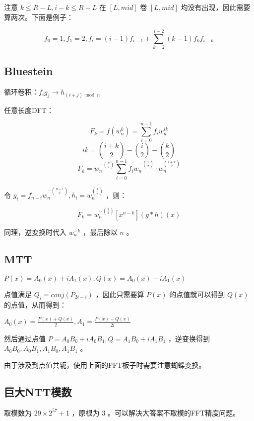 注意 $k\le R-L,i-k\le R-L$ 在 $[L,mid]$ 卷 $[L,mid]$ 均没有出现，因此需要算两次。下面是例子：

\vspace{-0.4cm}

$$
f_0=1,f_1=2,f_i=(i-1)f_{i-1}+\sum_{k=2}^{i-2}(k-1)f_kf_{i-k}
$$

\vspace{-0.1cm}



\subsection{Bluestein}

循环卷积：$f_ig_j\to h_{(i+j)\bmod n}$

任意长度DFT：

$$
F_k=f(w_n^k)=\sum_{i=0}^{n-1}f_iw_n^{ik}
$$
$$
ik={i+k\choose 2}-{i\choose 2}-{k\choose 2}
$$
$$
F_k=w_n^{-{k\choose 2}}\sum_{i=0}^{n-1}f_iw_n^{-{i\choose 2}}\cdot w_n^{i+k\choose 2}
$$

令 $g_{i}=f_{n-i}w_n^{-{n-i\choose 2}},h_i=w_n^{i\choose 2}$ ，则：

$$
F_{k}=w_n^{-{k\choose 2}}[x^{n-k}](g*h)(x)
$$

同理，逆变换时代入 $w_n^{-k}$ ，最后除以 $n$ 。

\subsection{MTT}

$P(x)=A_0(x)+iA_1(x),Q(x)=A_0(x)-iA_1(x)$

点值满足 $Q_i=conj(P_{2t-i})$ ，因此只需要算 $P(x)$ 的点值就可以得到 $Q(x)$ 的点值，从而得到：

$A_0(x)=\frac{P(x)+Q(x)}{2},A_1=\frac{P(x)-Q(x)}{2i}$

然后通过点值 $P=A_0B_0+iA_0B_1,Q=A_1B_0+iA_1B_1$ ，逆变换得到 $A_0B_0,A_0B_1,A_1B_0,A_1B_1$ 。

由于涉及到点值共轭，使用上面的FFT板子时需要注意蝴蝶变换。

\vspace{0.3cm}



\subsection{巨大NTT模数}

取模数为 $29\times2^{57}+1$ ，原根为 $3$ 。可以解决大答案不取模的FFT精度问题。

